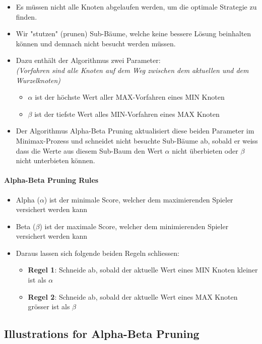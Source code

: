 \documentclass[a4paper]{article}
\begin{document}
		\begin{itemize}
			\item Es müssen nicht alle Knoten abgelaufen werden, um die optimale Strategie zu finden.
			\item Wir "stutzen" (prunen) Sub-Bäume, welche keine bessere Lösung beinhalten können und demnach nicht besucht werden müssen.
			\item Dazu enthält der Algorithmus zwei Parameter: \\
			\textit{(Vorfahren sind alle Knoten auf dem Weg zwischen dem aktuellen und dem Wurzelknoten)}
				\begin{itemize}
					\item $\alpha$ ist der höchste Wert aller MAX-Vorfahren eines MIN Knoten
					\item $\beta$ ist der tiefste Wert alles MIN-Vorfahren eines MAX Knoten
				\end{itemize}
			\item Der Algorithmus Alpha-Beta Pruning aktualisiert diese beiden Parameter im Minimax-Prozess und schneidet nicht besuchte Sub-Bäume ab, sobald er weiss dass die Werte aus diesem Sub-Baum den Wert $\alpha$ nicht überbieten oder $\beta$ nicht unterbieten können.
		\end{itemize}
		
		\paragraph{Alpha-Beta Pruning Rules}
		
		\begin{itemize}
			\item Alpha ($\alpha$) ist der minimale Score, welcher dem maximierenden Spieler versichert werden kann
			\item Beta ($\beta$) ist der maximale Score, welcher dem minimierenden Spieler versichert werden kann
			\item Daraus lassen sich folgende beiden Regeln schliessen:
				\begin{itemize}
					\item \textbf{Regel 1}: Schneide ab, sobald der aktuelle Wert eines MIN Knoten kleiner ist als $\alpha$
					\item \textbf{Regel 2}: Schneide ab, sobald der aktuelle Wert eines MAX Knoten grösser ist als $\beta$
				\end{itemize}
		\end{itemize}
	
		\subsection{Illustrations for Alpha-Beta Pruning}
		
\end{document}
